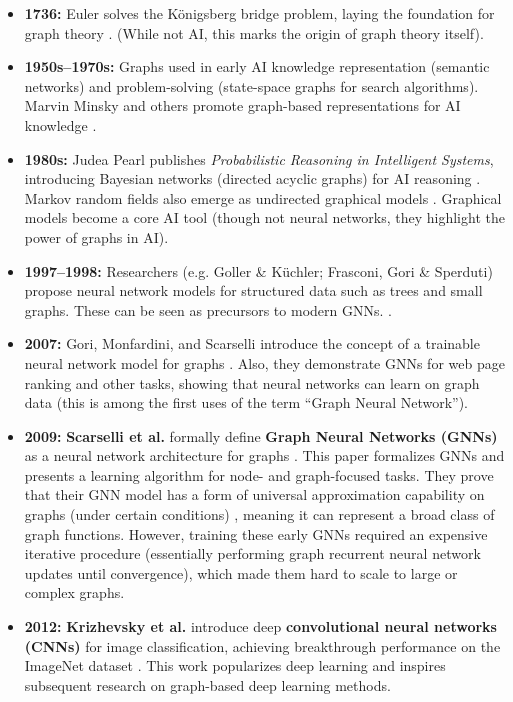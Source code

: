 \documentclass{article}
\begin{document}
\begin{itemize}
      \item \textbf{1736:} Euler solves the Königsberg bridge problem, laying the foundation for graph theory \cite{carlson2019konigsberg}. (While not AI, this marks the origin of graph theory itself).
      \item \textbf{1950s–1970s:} Graphs used in early AI knowledge representation (semantic networks) and problem-solving (state-space graphs for search algorithms). Marvin Minsky and others promote graph-based representations for AI knowledge \cite{kelemen2007neural}.
      \item \textbf{1980s:} Judea Pearl publishes \textit{Probabilistic Reasoning in Intelligent Systems}, introducing Bayesian networks (directed acyclic graphs) for AI reasoning \cite{pearl1995bayesian}. Markov random fields also emerge as undirected graphical models \cite{lang2024abstract}. Graphical models become a core AI tool (though not neural networks, they highlight the power of graphs in AI).
      \item \textbf{1997–1998:} Researchers (e.g. Goller \& Küchler; Frasconi, Gori \& Sperduti) propose neural network models for structured data such as trees and small graphs. These can be seen as precursors to modern GNNs. \cite{frasconi1998general}.
      \item \textbf{2007:} Gori, Monfardini, and Scarselli introduce the concept of a trainable neural network model for graphs \cite{gori2007new}. Also, they demonstrate GNNs for web page ranking and other tasks, showing that neural networks can learn on graph data (this is among the first uses of the term “Graph Neural Network”).
      \item \textbf{2009:} \textbf{Scarselli et al.} formally define \textbf{Graph Neural Networks (GNNs)} as a neural network architecture for graphs \cite{scarselli2009graph}. This paper formalizes GNNs and presents a learning algorithm for node- and graph-focused tasks. They prove that their GNN model has a form of universal approximation capability on graphs (under certain conditions) \cite{scarselli2009computational}, meaning it can represent a broad class of graph functions. However, training these early GNNs required an expensive iterative procedure (essentially performing graph recurrent neural network updates until convergence), which made them hard to scale to large or complex graphs.
      \item \textbf{2012:} \textbf{Krizhevsky et al.} introduce deep \textbf{convolutional neural networks (CNNs)} for image classification, achieving breakthrough performance on the ImageNet dataset \cite{krizhevsky2012imagenet}. This work popularizes deep learning and inspires subsequent research on graph-based deep learning methods.

\end{itemize}
\end{document}
